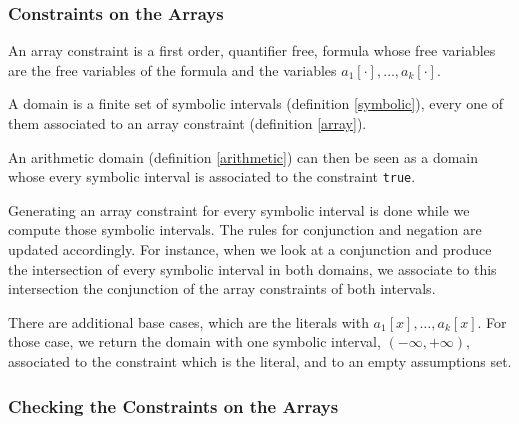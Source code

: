 \begin{example}
\end{example}

\subsubsection{Constraints on the Arrays}

\begin{definition}

An array constraint is a first order, quantifier free, formula whose
free variables are the free variables of the formula and the variables
$a_1[\cdot], \ldots, a_k[\cdot]$.

\label{array}

\end{definition}


\begin{definition}[Domain]

A domain is a finite set of symbolic intervals (definition
\ref{symbolic}), every one of them associated to an array constraint
(definition \ref{array}).

\label{domain}

\end{definition}

An arithmetic domain (definition \ref{arithmetic}) can then be seen as a
domain whose every symbolic interval is associated to the constraint
\texttt{true}.

Generating an array constraint for every symbolic interval is done while we compute those symbolic
intervals. The rules for conjunction and negation are updated accordingly. For instance, when we
look at a conjunction and produce the intersection of every symbolic interval in both domains, we
associate to this intersection the conjunction of the array constraints of both intervals.

There are additional base cases, which are the literals with $a_1[x], \ldots, a_k[x]$. For those
case, we return the domain with one symbolic interval, $(-\infty, +\infty)$, associated to the
constraint which is the literal, and to an empty assumptions set.

\subsubsection{Checking the Constraints on the Arrays}


